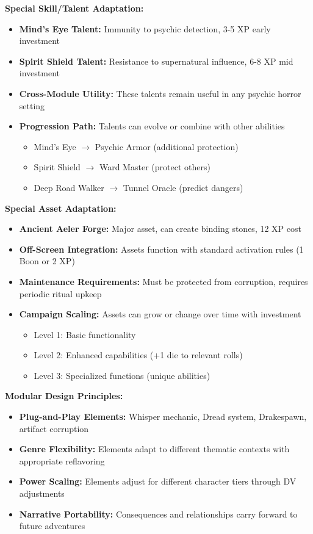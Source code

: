 \documentclass[11pt]{article}
\begin{document}
\textbf{Special Skill/Talent Adaptation:} \begin{itemize} \item \textbf{Mind's Eye Talent:} Immunity to psychic detection, 3-5 XP early investment \item \textbf{Spirit Shield Talent:} Resistance to supernatural influence, 6-8 XP mid investment \item \textbf{Cross-Module Utility:} These talents remain useful in any psychic horror setting \item \textbf{Progression Path:} Talents can evolve or combine with other abilities \begin{itemize} \item Mind's Eye $\rightarrow$ Psychic Armor (additional protection) \item Spirit Shield $\rightarrow$ Ward Master (protect others) \item Deep Road Walker $\rightarrow$ Tunnel Oracle (predict dangers) \end{itemize} \end{itemize}

\textbf{Special Asset Adaptation:} \begin{itemize} \item \textbf{Ancient Aeler Forge:} Major asset, can create binding stones, 12 XP cost \item \textbf{Off-Screen Integration:} Assets function with standard activation rules (1 Boon or 2 XP) \item \textbf{Maintenance Requirements:} Must be protected from corruption, requires periodic ritual upkeep \item \textbf{Campaign Scaling:} Assets can grow or change over time with investment \begin{itemize} \item Level 1: Basic functionality \item Level 2: Enhanced capabilities (+1 die to relevant rolls) \item Level 3: Specialized functions (unique abilities) \end{itemize} \end{itemize}

\textbf{Modular Design Principles:} \begin{itemize} \item \textbf{Plug-and-Play Elements:} Whisper mechanic, Dread system, Drakespawn, artifact corruption \item \textbf{Genre Flexibility:} Elements adapt to different thematic contexts with appropriate reflavoring \item \textbf{Power Scaling:} Elements adjust for different character tiers through DV adjustments \item \textbf{Narrative Portability:} Consequences and relationships carry forward to future adventures \end{itemize}
\end{document}
